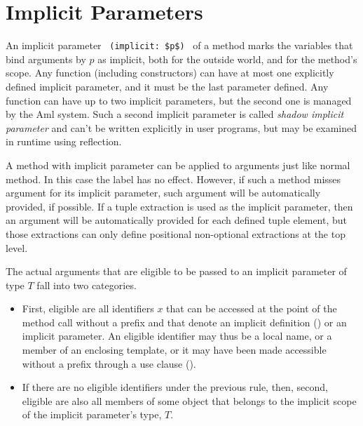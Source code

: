 \section{Implicit Parameters}
\label{sec:implicit-parameters}

An implicit parameter ~\lstinline!(implicit: $p$)!~ of a method marks the variables that bind arguments by $p$ as implicit, both for the outside world, and for the method's scope. Any function (including constructors) can have at most one explicitly defined implicit parameter, and it must be the last parameter defined. Any function can have up to two implicit parameters, but the second one is managed by the Aml system. Such a second implicit parameter is called {\em shadow implicit parameter} and can't be written explicitly in user programs, but may be examined in runtime using reflection. 

A method with implicit parameter can be applied to arguments just like normal method. In this case the  label has no effect. However, if such a method misses argument for its implicit parameter, such argument will be automatically provided, if possible. If a tuple extraction is used as the implicit parameter, then an argument will be automatically provided for each defined tuple element, but those extractions can only define positional non-optional extractions at the top level. 

The actual arguments that are eligible to be passed to an implicit parameter of type $T$ fall into two categories.
\begin{itemize}
  \item First, eligible are all identifiers $x$ that can be accessed at the point of the method call without a prefix and that denote an implicit definition () or an implicit parameter. An eligible identifier may thus be a local name, or a member of an enclosing template, or it may have been made accessible without a prefix through a use clause (). 
  \item If there are no eligible identifiers under the previous rule, then, second, eligible are also all  members of some object that belongs to the implicit scope of the implicit parameter's type, $T$. 
\end{itemize}

